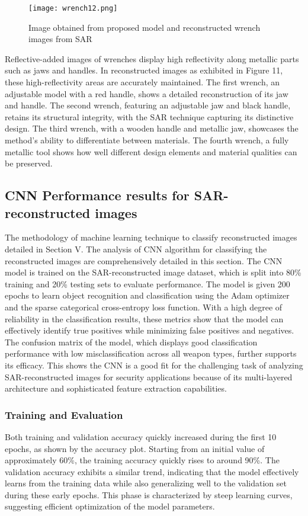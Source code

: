\documentclass[journal,article,submit,pdftex,moreauthors]{Definitions/mdpi}
\begin{document}
\begin{figure}[h]
  \centering
  \texttt{[image: wrench12.png]}
  \caption{Image obtained from proposed model and reconstructed wrench images from SAR}
  \label{Figure:}
\end{figure}


Reflective-added images of wrenches display high reflectivity along metallic parts such as jaws and handles. In reconstructed images as exhibited in Figure 11, these high-reflectivity areas are accurately maintained. The first wrench, an adjustable model with a red handle, shows a detailed reconstruction of its jaw and handle. The second wrench, featuring an adjustable jaw and black handle, retains its structural integrity, with the SAR technique capturing its distinctive design. The third wrench, with a wooden handle and metallic jaw, showcases the method's ability to differentiate between materials. The fourth wrench, a fully metallic tool shows how well different design elements and material qualities can be preserved.


\subsection{CNN Performance results for SAR-reconstructed images}
The methodology of machine learning technique to classify reconstructed images detailed in Section V. The analysis of CNN algorithm for classifying the reconstructed images are comprehensively detailed in this section. The CNN model is trained on the SAR-reconstructed image dataset, which is split into 80\% training and 20\% testing sets to evaluate performance. The model is given 200 epochs to learn object recognition and classification using the Adam optimizer and the sparse categorical cross-entropy loss function. With a high degree of reliability in the classification results, these metrics show that the model can effectively identify true positives while minimizing false positives and negatives. The confusion matrix of the model, which displays good classification performance with low misclassification across all weapon types, further supports its efficacy. This shows the CNN is a good fit for the challenging task of analyzing SAR-reconstructed images for security applications because of its multi-layered architecture and sophisticated feature extraction capabilities.



\subsubsection{Training and Evaluation}
Both training and validation accuracy quickly increased during the first 10 epochs, as shown by the accuracy plot. Starting from an initial value of approximately 60\%, the training accuracy quickly rises to around 90\%. The validation accuracy exhibits a similar trend, indicating that the model effectively learns from the training data while also generalizing well to the validation set during these early epochs. This phase is characterized by steep learning curves, suggesting efficient optimization of the model parameters.
\end{document}
